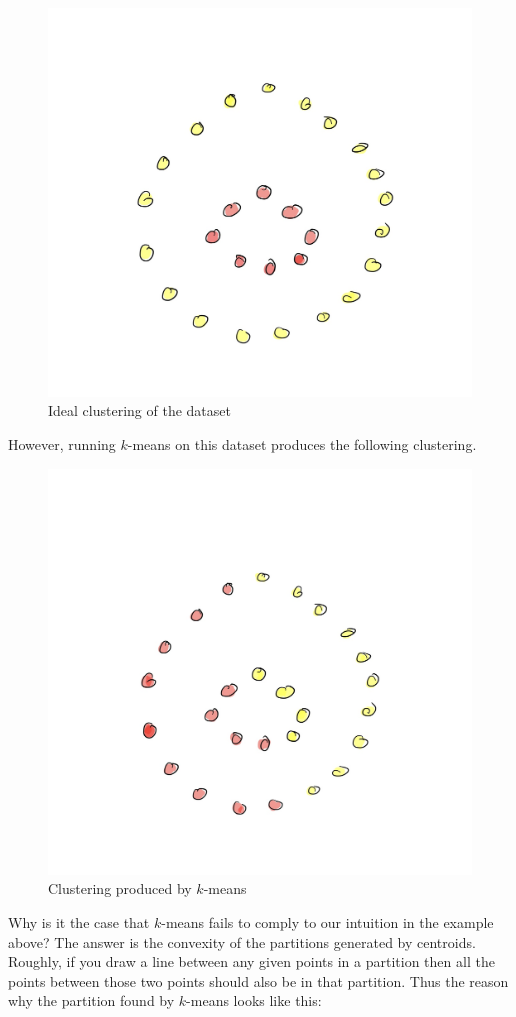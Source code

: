 \begin{figure}
\begin{center}
\includegraphics[width=.7\linewidth]{chapter_2/files/intuition.jpg}
\end{center}
\caption{Ideal clustering of the dataset}
\end{figure}

However, running $k$-means on this dataset produces the following clustering.

\begin{figure}
\begin{center}
\includegraphics[width=.7\linewidth]{chapter_2/files/kmeans.jpg}
\end{center}
\caption{Clustering produced by $k$-means}
\end{figure}

Why is it the case that $k$-means fails to comply to our intuition in the example
above? The answer is the convexity of the partitions generated by centroids. Roughly,
if you draw a line between any given points in a partition then all the points
between those two points should also be in that partition. Thus the reason
why the partition found by $k$-means looks like this:

